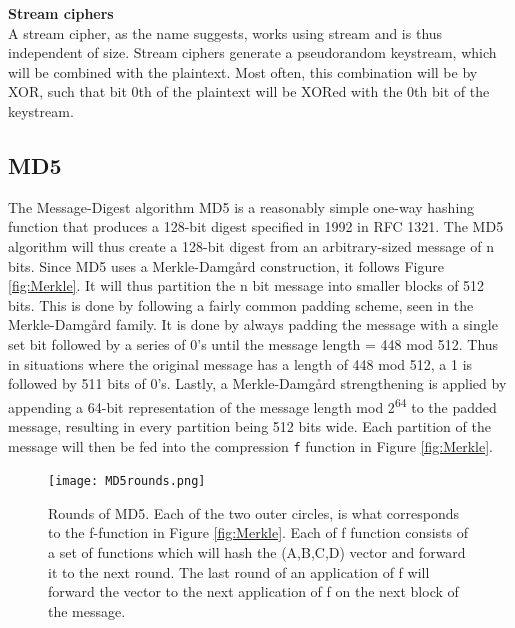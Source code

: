 \documentclass[a4paper]{article}
\begin{document}
\textbf{Stream ciphers}\\
A stream cipher, as the name suggests, works using stream and is thus independent of size. Stream ciphers generate a pseudorandom keystream, which will be combined with the plaintext. Most often, this combination will be by XOR, such that bit 0th of the plaintext will be XORed with the 0th bit of the keystream.

\subsection{MD5}
\label{MD5alg}
The Message-Digest algorithm MD5 is a reasonably simple one-way hashing function that produces a 128-bit digest specified in 1992 in RFC 1321\cite{rfc1321}.
The MD5 algorithm will thus create a 128-bit digest from an arbitrary-sized message of n bits. Since MD5 uses a Merkle-Damgård construction, it follows Figure \ref{fig:Merkle}. It will thus partition the n bit message into smaller blocks of 512 bits. This is done by following a fairly common padding scheme, seen in the Merkle-Damgård family. It is done by always padding the message with a single set bit followed by a series of 0's until the message length = 448 mod 512. Thus in situations where the original message has a length of 448 mod 512, a 1 is followed by 511 bits of 0's. Lastly, a Merkle-Damgård strengthening is applied by appending a 64-bit representation of the message length mod 2\textsuperscript{64} to the padded message, resulting in every partition being 512 bits wide.
Each partition of the message will then be fed into the compression \texttt{f} function in Figure \ref{fig:Merkle}.


\begin{figure}[!htb]
\centering
\texttt{[image: MD5rounds.png]}
\caption[MD5 Rounds]%
{Rounds of MD5. Each of the two outer circles, is what corresponds to the f-function in Figure \ref{fig:Merkle}. Each of f function consists of a set of functions which will hash the (A,B,C,D) vector and forward it to the next round. The last round of an application of f will forward the vector to the next application of f on the next block of the message.}
\label{fig:MD5}
\end{figure}
\end{document}
